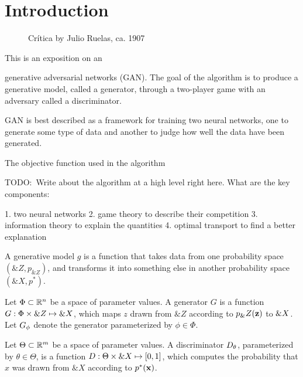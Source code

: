 \section{Introduction}%
\setcounter{page}{1}

\vspace{1cm}

\begin{figure}[h]
  \label{fig:paradise} \centering
{}
  \caption{Crítica by Julio Ruelas, ca. 1907}
\end{figure}

\vspace{1cm}

\noindent This is an exposition on an

generative
adversarial networks (GAN).  The goal of the algorithm is to produce a
generative model, called a generator, through a two-player game with
an adversary called a discriminator.

GAN is best described as a framework for training two neural networks,
one to generate some type of data and another to judge how well the
data have been generated.

The objective function used in the algorithm

TODO:\ Write about the algorithm at a high level right here.  What are
the key components:

1. two neural networks
2. game theory to describe their competition
3. information theory to explain the quantities
4. optimal transport to find a better explanation


A generative model $g$ is a function that takes data from one
probability space $(\&Z, p_{\&Z})$, and transforms it into something
else in another probability space $(\&X, p^*)$.

\begin{definition}%
  \label{def:generator}
  Let $\Phi \subset \mathbb{R}^n$ be a space of parameter values. A
  \textnormal{\sffamily generator} $G$ is a function
  $G: \Phi \times \&Z \mapsto \&X$, which maps $z$ drawn from
  $\&Z$ according to $p_\&Z(\mathbf{z})$ to $\&X$.  Let $G_\phi$ denote the
  generator parameterized by $\phi \in \Phi$.
\end{definition}

\begin{definition}%
  \label{def:discriminator}
  Let $\Theta \subset \mathbb{R}^m$ be a space of parameter values. A
  \textnormal{\sffamily discriminator} $D_\theta$, parameterized by
  $\theta \in \Theta$, is a function
  $D: \Theta \times \&X \mapsto [0, 1]$, which computes the
  probability that $x$ was drawn from $\&X$ according to $p^*(\mathbf{x})$.
\end{definition}

